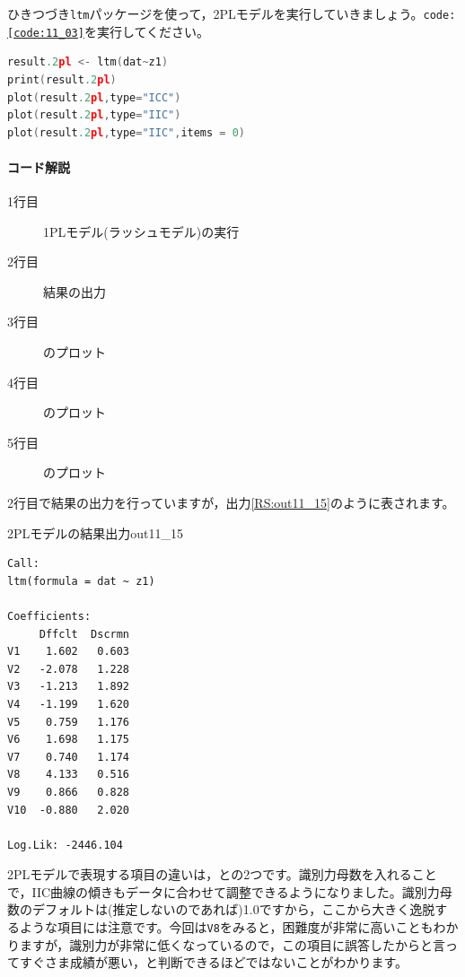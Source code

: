 \documentclass{ltjsbook}
\begin{document}
ひきつづき\texttt{ltm}パッケージを使って，2PLモデルを実行していきましょう。\texttt{code:\ref{code:11_03}}を実行してください。

\begin{lstlisting}[language=c++,label={code:11_03},caption={2PLモデルの実行}]
result.2pl <- ltm(dat~z1)
print(result.2pl)
plot(result.2pl,type="ICC")
plot(result.2pl,type="IIC")
plot(result.2pl,type="IIC",items = 0)
\end{lstlisting}

\paragraph{コード解説}
\begin{description}
	\item[1行目] 1PLモデル(ラッシュモデル)の実行
	\item[2行目] 結果の出力
	\item[3行目] のプロット
	\item[4行目] のプロット
	\item[5行目] のプロット
\end{description}

2行目で結果の出力を行っていますが，出力\ref{RS:out11_15}のように表されます。
\begin{Rscreen}{2PLモデルの結果出力}{out11_15}
	\begin{verbatim}
Call:
ltm(formula = dat ~ z1)

Coefficients:
     Dffclt  Dscrmn
V1    1.602   0.603
V2   -2.078   1.228
V3   -1.213   1.892
V4   -1.199   1.620
V5    0.759   1.176
V6    1.698   1.175
V7    0.740   1.174
V8    4.133   0.516
V9    0.866   0.828
V10  -0.880   2.020

Log.Lik: -2446.104
    \end{verbatim}
\end{Rscreen}

2PLモデルで表現する項目の違いは，との2つです。識別力母数を入れることで，IIC曲線の傾きもデータに合わせて調整できるようになりました。識別力母数のデフォルトは(推定しないのであれば)1.0ですから，ここから大きく逸脱するような項目には注意です。今回は\texttt{V8}をみると，困難度が非常に高いこともわかりますが，識別力が非常に低くなっているので，この項目に誤答したからと言ってすぐさま成績が悪い，と判断できるほどではないことがわかります。
\end{document}
